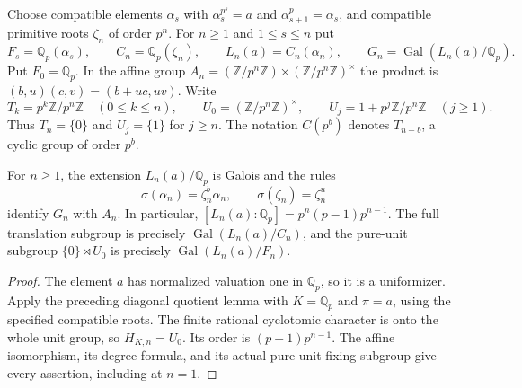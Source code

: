 \begin{notation}
\label{ft:finite-radical-setup}
\leanok
Choose compatible elements $\alpha_s$ with $\alpha_s^{p^s}=a$ and
$\alpha_{s+1}^p=\alpha_s$, and compatible primitive roots $\zeta_n$ of
order $p^n$. For $n\geq1$ and $1\leq s\leq n$ put
\[
 F_s=\mathbb Q_p(\alpha_s),\qquad
 C_n=\mathbb Q_p(\zeta_n),\qquad
 L_n(a)=C_n(\alpha_n),\qquad
 G_n=\operatorname{Gal}(L_n(a)/\mathbb Q_p).
\]
Put $F_0=\mathbb Q_p$. In the affine group
$A_n=(\mathbb Z/p^n\mathbb Z)\rtimes(\mathbb Z/p^n\mathbb Z)^\times$
the product is $(b,u)(c,v)=(b+uc,uv)$. Write
\[
 T_k=p^k\mathbb Z/p^n\mathbb Z\quad(0\leq k\leq n),\qquad
 U_0=(\mathbb Z/p^n\mathbb Z)^\times,\qquad
 U_j=1+p^j\mathbb Z/p^n\mathbb Z\quad(j\geq1).
\]
Thus $T_n=\{0\}$ and $U_j=\{1\}$ for $j\geq n$.
The notation $C(p^b)$ denotes $T_{n-b}$, a cyclic group of order $p^b$.
\end{notation}

\begin{lemma}
\label{ft:finite-galois-structure}
\leanok
{}
For $n\geq1$, the extension $L_n(a)/\mathbb Q_p$ is Galois and the rules
\[
 \sigma(\alpha_n)=\zeta_n^b\alpha_n,\qquad
 \sigma(\zeta_n)=\zeta_n^u
\]
identify $G_n$ with $A_n$. In particular,
$[L_n(a):\mathbb Q_p]=p^n(p-1)p^{n-1}$.
The full translation subgroup is precisely
$\operatorname{Gal}(L_n(a)/C_n)$, and the pure-unit subgroup
$\{0\}\rtimes U_0$ is precisely $\operatorname{Gal}(L_n(a)/F_n)$.
\end{lemma}
\begin{proof}
The element $a$ has normalized valuation one in $\mathbb Q_p$, so it
is a uniformizer. Apply the preceding diagonal quotient lemma with
$K=\mathbb Q_p$ and $\pi=a$, using the specified compatible roots.
The finite rational cyclotomic character is onto the whole unit group,
so $H_{K,n}=U_0$. Its order is $(p-1)p^{n-1}$.
The affine isomorphism, its degree formula, and its actual pure-unit
fixing subgroup give every assertion, including at $n=1$.
\end{proof}

